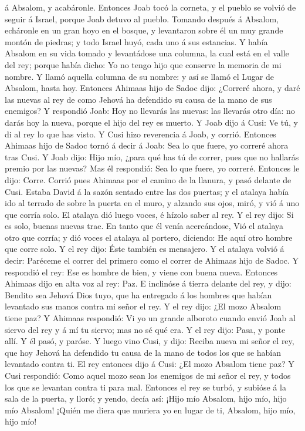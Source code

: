á Absalom, y acabáronle.  Entonces Joab tocó la corneta, y
el pueblo se volvió de seguir á Israel, porque Joab detuvo al pueblo.
 Tomando después á Absalom, echáronle en un gran hoyo en el
bosque, y levantaron sobre él un muy grande montón de piedras; y todo
Israel huyó, cada uno á sus estancias.  Y había Absalom en
su vida tomado y levantádose una columna, la cual está en el valle del
rey; porque había dicho: Yo no tengo hijo que conserve la memoria de mi
nombre. Y llamó aquella columna de su nombre: y así se llamó el Lugar de
Absalom, hasta hoy.  Entonces Ahimaas hijo de Sadoc dijo:
¿Correré ahora, y daré las nuevas al rey de como Jehová ha defendido su
causa de la mano de sus enemigos?  Y respondió Joab: Hoy no
llevarás las nuevas: las llevarás otro día: no darás hoy la nueva,
porque el hijo del rey es muerto.  Y Joab dijo á Cusi: Ve
tú, y di al rey lo que has visto. Y Cusi hizo reverencia á Joab, y
corrió.  Entonces Ahimaas hijo de Sadoc tornó á decir á
Joab: Sea lo que fuere, yo correré ahora tras Cusi. Y Joab dijo: Hijo
mío, ¿para qué has tú de correr, pues que no hallarás premio por las
nuevas?  Mas él respondió: Sea lo que fuere, yo correré.
Entonces le dijo: Corre. Corrió pues Ahimaas por el camino de la
llanura, y pasó delante de Cusi.  Estaba David á la sazón
sentado entre las dos puertas; y el atalaya había ido al terrado de
sobre la puerta en el muro, y alzando sus ojos, miró, y vió á uno que
corría solo.  El atalaya dió luego voces, é hízolo saber al
rey. Y el rey dijo: Si es solo, buenas nuevas trae. En tanto que él
venía acercándose,  Vió el atalaya otro que corría; y dió
voces el atalaya al portero, diciendo: He aquí otro hombre que corre
solo. Y el rey dijo: Éste también es mensajero.  Y el
atalaya volvió á decir: Paréceme el correr del primero como el correr de
Ahimaas hijo de Sadoc. Y respondió el rey: Ese es hombre de bien, y
viene con buena nueva.  Entonces Ahimaas dijo en alta voz
al rey: Paz. E inclinóse á tierra delante del rey, y dijo: Bendito sea
Jehová Dios tuyo, que ha entregado á los hombres que habían levantado
sus manos contra mi señor el rey.  Y el rey dijo: ¿El mozo
Absalom tiene paz? Y Ahimaas respondió: Vi yo un grande alboroto cuando
envió Joab al siervo del rey y á mí tu siervo; mas no sé qué era.
 Y el rey dijo: Pasa, y ponte allí. Y él pasó, y paróse.
 Y luego vino Cusi, y dijo: Reciba nueva mi señor el rey,
que hoy Jehová ha defendido tu causa de la mano de todos los que se
habían levantado contra ti.  El rey entonces dijo á Cusi:
¿El mozo Absalom tiene paz? Y Cusi respondió: Como aquel mozo sean los
enemigos de mi señor el rey, y todos los que se levantan contra ti para
mal.  Entonces el rey se turbó, y subióse á la sala de la
puerta, y lloró; y yendo, decía así: ¡Hijo mío Absalom, hijo mío, hijo
mío Absalom! ¡Quién me diera que muriera yo en lugar de ti, Absalom,
hijo mío, hijo mío!

